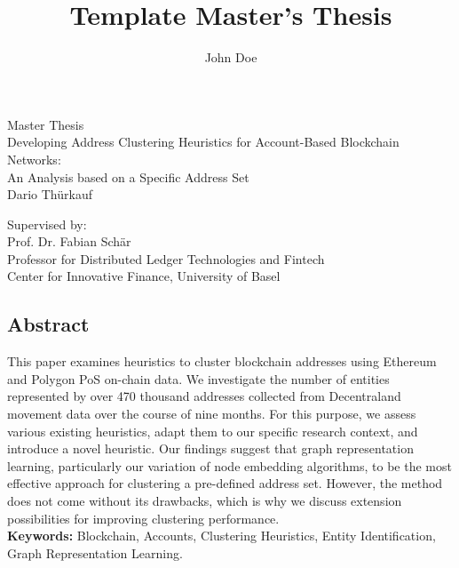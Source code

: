 \documentclass[12pt,a4paper,titlepage,oneside,english]{article}
\title{Template Master's Thesis}
\author{John Doe}
\begin{document}
\begin{center}
\vspace{1em}
\large{Master Thesis}\\
\LARGE Developing Address Clustering Heuristics for Account-Based Blockchain Networks:\\ An Analysis based on a Specific Address Set \\
\Large \vspace{1em}
Dario Thürkauf
\end{center}

\vspace{1em}
\normalsize
\begin{flushleft}
Supervised by: \\
Prof. Dr. Fabian Schär \\ 
Professor for Distributed Ledger Technologies and Fintech \\
Center for Innovative Finance, University of Basel
\end{flushleft}

\vspace{1em}
\onehalfspacing
\begin{center}
\section*{Abstract}
\end{center}
This paper examines heuristics to cluster blockchain addresses using Ethereum and Polygon PoS on-chain data. We investigate the number of entities represented by over 470 thousand addresses collected from Decentraland movement data over the course of nine months. For this purpose, we assess various existing heuristics, adapt them to our specific research context, and introduce a novel heuristic. Our findings suggest that graph representation learning, particularly our variation of node embedding algorithms, to be the most effective approach for clustering a pre-defined address set. However, the method does not come without its drawbacks, which is why we discuss extension possibilities for improving clustering performance. \\

\vfill
\textbf{Keywords:} Blockchain, Accounts, Clustering Heuristics, Entity Identification, Graph Representation Learning.\\
\end{document}
